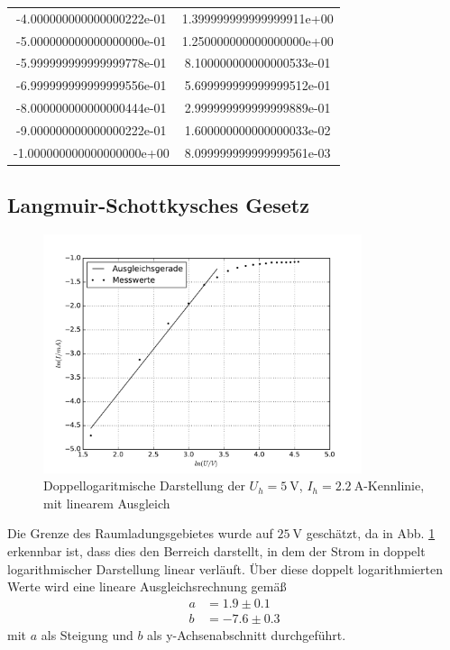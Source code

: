 \begin{table}
\begin{tabular}{|S|S|}
    -4.000000000000000222e-01 & 1.399999999999999911e+00\\
    -5.000000000000000000e-01 & 1.250000000000000000e+00\\
    -5.999999999999999778e-01 & 8.100000000000000533e-01\\
    -6.999999999999999556e-01 & 5.699999999999999512e-01\\
    -8.000000000000000444e-01 & 2.999999999999999889e-01\\
    -9.000000000000000222e-01 & 1.600000000000000033e-02\\
    -1.000000000000000000e+00 & 8.099999999999999561e-03\\
    \bottomrule
  \end{tabular}
\end{table}
\FloatBarrier

\subsection{Langmuir-Schottkysches Gesetz}

\begin{figure}
  \centering
  \includegraphics[height=7cm]{./plots/langmuir.pdf}
  \caption{Doppellogaritmische Darstellung der $U_h = \SI{5}{\volt}$, $I_h = \SI{2.2}{\ampere}$-Kennlinie, mit linearem Ausgleich}
  \label{fig:langmuir}
\end{figure}

Die Grenze des Raumladungsgebietes wurde auf $\SI{25}{\volt}$ geschätzt, da in Abb. \ref{fig:langmuir} erkennbar ist, dass dies den Berreich darstellt, in dem der Strom in doppelt logarithmischer Darstellung linear verläuft. Über diese doppelt logarithmierten Werte wird eine lineare Ausgleichsrechnung gemäß
\begin{align*}
  a &= 1.9 \pm  0.1 \\
  b &= -7.6 \pm 0.3
\end{align*}
mit $a$ als Steigung und $b$  als y-Achsenabschnitt durchgeführt.

